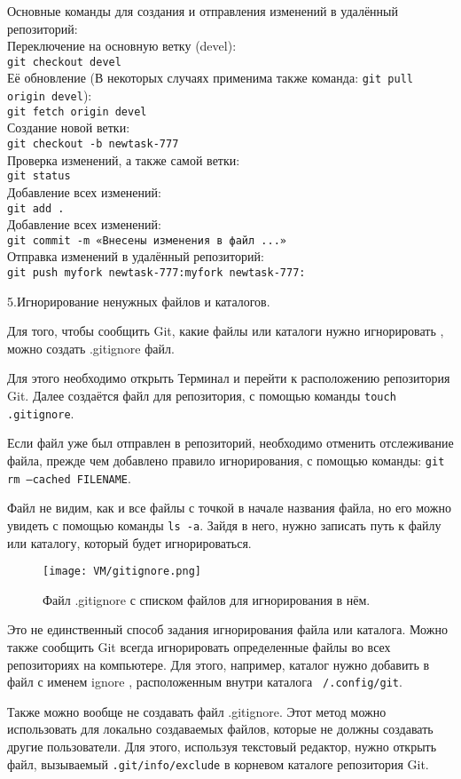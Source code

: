 Основные команды для создания и отправления изменений в удалённый репозиторий:
\\Переключение на основную ветку (devel):
\\ \texttt{git checkout devel}
\\ \quad Её обновление (В некоторых случаях применима также команда: \texttt{git pull origin devel}):
\\ \texttt{git fetch origin devel}
\\ \quad Создание новой ветки:
\\ \texttt{git checkout -b newtask-777}
\\ \quad Проверка изменений, а также самой ветки:
\\ \texttt{git status}
\\ \quad Добавление всех изменений:
\\ \texttt{git add .}
\\ \quad Добавление всех изменений:
\\ \texttt{git commit -m «Внесены изменения в файл ...»}
\\ \quad Отправка изменений в удалённый репозиторий:
\\ \texttt{git push myfork newtask-777:myfork newtask-777:}

5.\quad  Игнорирование ненужных файлов и каталогов.

Для того, чтобы сообщить Git, какие файлы или каталоги нужно игнорировать , можно создать .gitignore файл.

Для этого необходимо открыть Терминал и перейти к расположению репозитория Git. Далее создаётся файл для репозитория, с помощью команды \texttt{touch .gitignore}.

Если файл уже был отправлен в репозиторий, необходимо отменить отслеживание файла, прежде чем добавлено правило игнорирования, с помощью команды: \texttt{git rm —cached FILENAME}.

Файл не видим, как и все файлы с точкой в начале названия файла, но его можно увидеть с помощью команды \texttt{ls -a}. Зайдя в него, нужно записать путь к файлу или каталогу, который будет игнорироваться.

\begin{figure}[h]
		\centering
		\texttt{[image: VM/gitignore.png]}
\caption{Файл .gitignore с списком файлов для игнорирования в нём.}
\label{ris:image}
\end{figure}

Это не единственный способ задания игнорирования файла или каталога. Можно также сообщить Git всегда игнорировать определенные файлы во всех репозиториях на компьютере. Для этого, например, каталог нужно добавить в файл с именем ignore , расположенным внутри каталога \texttt{~/.config/git}.

Также можно вообще не создавать файл .gitignore. Этот метод можно использовать для локально создаваемых файлов, которые не должны создавать другие пользователи. Для этого, используя текстовый редактор, нужно открыть файл, вызываемый \texttt{.git/info/exclude} в корневом каталоге репозитория Git.